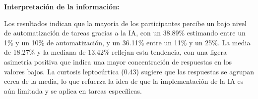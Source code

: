 \noindent\textbf{Interpretación de la información:}


Los resultados indican que la mayoría de los participantes percibe un bajo nivel de automatización de tareas gracias a la IA, con un 38.89\% estimando entre un 1\% y un 10\% de automatización, y un 36.11\% entre un 11\% y un 25\%. La media de 18.27\% y la mediana de 13.42\% reflejan esta tendencia, con una ligera asimetría positiva que indica una mayor concentración de respuestas en los valores bajos. La curtosis leptocúrtica (0.43) sugiere que las respuestas se agrupan cerca de la media, lo que refuerza la idea de que la implementación de la IA es aún limitada y se aplica en tareas específicas.
